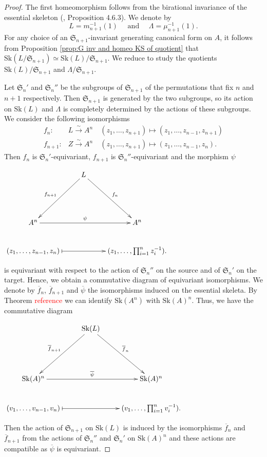 \documentclass{amsart}%
\numberwithin{equation}{subsection}
\theoremstyle{plain2}
\theoremstyle{definition2}
\theoremstyle{stepstyle}
\theoremstyle{point}
\theoremstyle{subpoint}
\newcommand{\Sk}{\mathrm{Sk}}
\begin{document}
\begin{proof}
The first homeomorphism follows from the birational invariance of the essential skeleton (\cite{MustataNicaise}, Proposition 4.6.3). We denote by $$L=m_{n+1}^{-1}(1) \quad \text{ and }\quad \Lambda=\mu_{n+1}^{-1}(1).$$ For any choice of an $\mathfrak{S}_{n+1}$-invariant generating canonical form on $A$, it follows from Proposition \ref{prop:G inv and homeo KS of quotient} that $\Sk(L/\mathfrak{S}_{n+1}) \simeq \Sk(L)/\mathfrak{S}_{n+1}$. We reduce to study the quotients $\Sk(L)/\mathfrak{S}_{n+1}$ and $\Lambda/\mathfrak{S}_{n+1}$.

Let $\mathfrak{S}_n'$ and $\mathfrak{S}_n''$ be the subgroups of $\mathfrak{S}_{n+1}$ of the permutations that fix $n$ and $n+1$ respectively. Then $\mathfrak{S}_{n+1}$ is generated by the two subgroups, so its action on $\Sk(L)$ and $\Lambda$ is completely determined by the actions of these subgroups. We consider the following isomorphisms 
\begin{align*}
f_n: &L \xrightarrow{\sim} A^n \quad (z_1,\ldots,z_{n+1}) \mapsto (z_1,\ldots,z_{n-1},z_{n+1}) \\
f_{n+1}: &Z \xrightarrow{\sim} A^n \quad (z_1,\ldots,z_{n+1}) \mapsto (z_1,\ldots,z_{n-1},z_{n}).
\end{align*} Then $f_n$ is $\mathfrak{S}_n'$-equivariant, $f_{n+1}$ is $\mathfrak{S}_n''$-equivariant and the morphism $\psi$
\begin{center}
\xymatrixrowsep{0.1pc} $\xymatrix{
& L  \ar[ldd]_{f_{n+1}} \ar[ddr]^{f_n} &\\
& & \\
A^n \ar[rr]^{\psi}& & A^n \\
(z_1,\ldots,z_{n-1},z_{n}) \ar@{|->}[rr]& & (z_1,\ldots, \prod_{i=1}^{n} z_i^{-1}).
}$
\end{center} is equivariant with respect to the action of $\mathfrak{S}_n''$ on the source and of $\mathfrak{S}_n'$ on the target. Hence, we obtain a commutative diagram of equivariant isomorphisms. We denote by $\overline{f}_n$, $\overline{f}_{n+1}$ and $\overline{\psi}$ the isomorphisms induced on the essential skeleta. By Theorem \textcolor{red}{reference} we can identify $\Sk(A^n)$ with $\Sk(A)^n$. Thus, we have the commutative diagram
\begin{center}
\xymatrixrowsep{0.1pc} $\xymatrix{
& \Sk(L)  \ar[ldd]_{\overline{f}_{n+1}} \ar[ddr]^{\overline{f}_n} &\\
& & \\
\Sk(A)^n \ar[rr]^{\overline{\psi}}& & \Sk(A)^n \\
(v_1,\ldots,v_{n-1},v_{n}) \ar@{|->}[rr]& & (v_1,\ldots, \prod_{i=1}^{n} v_i^{-1}).
}$
\end{center} Then the action of $\mathfrak{S}_{n+1}$ on $\Sk(L)$ is induced by the isomorphisms $\overline{f}_n$ and $\overline{f}_{n+1}$ from the actions of $\mathfrak{S}_n''$ and $\mathfrak{S}_n'$ on $\Sk(A)^n$ and these actions are compatible as $\overline{\psi}$ is equivariant.


\end{proof}
\end{document}
